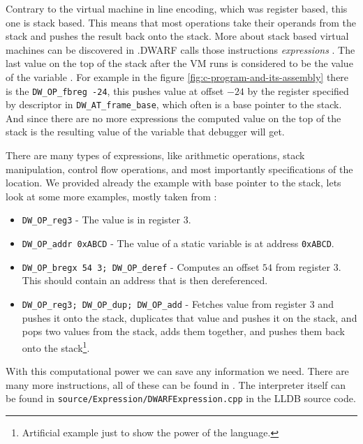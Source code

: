 Contrary to the virtual machine in line encoding, which was register based,
this one is stack based. This means that most operations take their operands
from the stack and pushes the result back onto the stack. More about stack
based virtual machines can be discovered in \cite{crafting-interpreters}.DWARF
calls those instructions \textit{expressions} \cite{dwarf}. The last value on
the top of the stack after the VM runs is considered to be the value of the
variable \cite{dwarf}. For example in the figure
\ref{fig:c-program-and-its-assembly} there is the \texttt{DW\_OP\_fbreg -24},
this pushes value at offset $-24$ by the register specified by descriptor in
\texttt{DW\_AT\_frame\_base}, which often is a base pointer to the stack. And
since there are no more expressions the computed value on the top of the stack
is the resulting value of the variable that debugger will get.

There are many types of expressions, like arithmetic operations, stack
manipulation, control flow operations, and most importantly specifications of
the location. We provided already the example with base pointer to the stack,
lets look at some more examples, mostly taken from \cite{dwarf}:
\begin{itemize}
    \item \texttt{DW\_OP\_reg3} - The value is in register $3$.
    \item \texttt{DW\_OP\_addr 0xABCD} - The value of a static variable is at
        address \texttt{0xABCD}.
    \item \texttt{DW\_OP\_bregx 54 3; DW\_OP\_deref} - Computes an offset $54$
        from register $3$. This should contain an address that is then
        dereferenced.
    \item \texttt{DW\_OP\_reg3; DW\_OP\_dup; DW\_OP\_add} - Fetches value from
        register $3$ and pushes it onto the stack, duplicates that value and
        pushes it on the stack, and pops two values from the stack, adds them
        together, and pushes them back onto the stack\footnote{Artificial
        example just to show the power of the language.}.
\end{itemize}
With this computational power we can save any information we need. There are
many more instructions, all of these can be found in \cite{dwarf}. The
interpreter itself can be found in
\texttt{source/Expression/DWARFExpression.cpp} in the LLDB source code.

